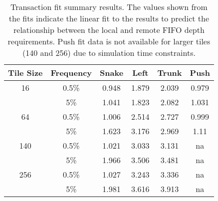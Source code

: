 \begin{table}
	\begin{center}
		\begin{tabular}{|c c|c|c|c|c|}
			\hline
			Tile Size & Frequency & Snake & Left & Trunk & Push \\
			\hline
			16 & 0.5\% & 0.948 & 1.879 & 2.039 & 0.979 \\
			& 5\% & 1.041 & 1.823 & 2.082 & 1.031 \\
			\hline
			64 & 0.5\% & 1.006 & 2.514 & 2.727 & 0.999 \\
			& 5\% & 1.623 & 3.176 & 2.969 & 1.11 \\
			\hline
			140 & 0.5\% & 1.021 & 3.033 & 3.131 & na \\
			& 5\% & 1.966 & 3.506 & 3.481 & na \\
			\hline
			256 & 0.5\% & 1.027 & 3.243 & 3.336 & na \\
			& 5\% & 1.981 & 3.616 & 3.913 & na \\
			\hline
		\end{tabular}
	\end{center}
	\caption{Transaction fit summary results.
	The values shown from the fits indicate the linear fit to the results to predict the relationship between the local and remote FIFO depth requirements.
	Push fit data is not available for larger tiles (140 and 256) due to simulation time constraints.
	}
	\label{tab:fit}
\end{table}